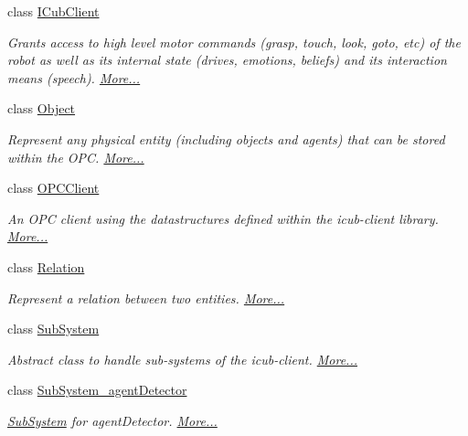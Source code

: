 \begin{DoxyCompactItemize}
class \hyperlink{group__icubclient__clients_classicubclient_1_1ICubClient}{I\+Cub\+Client}
\begin{DoxyCompactList}\small\item\em Grants access to high level motor commands (grasp, touch, look, goto, etc) of the robot as well as its internal state (drives, emotions, beliefs) and its interaction means (speech).  \hyperlink{group__icubclient__clients_classicubclient_1_1ICubClient}{More...}\end{DoxyCompactList}\item 
class \hyperlink{group__icubclient__representations_classicubclient_1_1Object}{Object}
\begin{DoxyCompactList}\small\item\em Represent any physical entity (including objects and agents) that can be stored within the O\+PC.  \hyperlink{group__icubclient__representations_classicubclient_1_1Object}{More...}\end{DoxyCompactList}\item 
class \hyperlink{group__icubclient__clients_classicubclient_1_1OPCClient}{O\+P\+C\+Client}
\begin{DoxyCompactList}\small\item\em An O\+PC client using the datastructures defined within the icub-\/client library.  \hyperlink{group__icubclient__clients_classicubclient_1_1OPCClient}{More...}\end{DoxyCompactList}\item 
class \hyperlink{group__icubclient__representations_classicubclient_1_1Relation}{Relation}
\begin{DoxyCompactList}\small\item\em Represent a relation between two entities.  \hyperlink{group__icubclient__representations_classicubclient_1_1Relation}{More...}\end{DoxyCompactList}\item 
class \hyperlink{group__icubclient__subsystems_classicubclient_1_1SubSystem}{Sub\+System}
\begin{DoxyCompactList}\small\item\em Abstract class to handle sub-\/systems of the icub-\/client.  \hyperlink{group__icubclient__subsystems_classicubclient_1_1SubSystem}{More...}\end{DoxyCompactList}\item 
class \hyperlink{group__icubclient__subsystems_classicubclient_1_1SubSystem__agentDetector}{Sub\+System\+\_\+agent\+Detector}
\begin{DoxyCompactList}\small\item\em \hyperlink{group__icubclient__subsystems_classicubclient_1_1SubSystem}{Sub\+System} for agent\+Detector.  \hyperlink{group__icubclient__subsystems_classicubclient_1_1SubSystem__agentDetector}{More...}\end{DoxyCompactList}\item 

\end{DoxyCompactItemize}
